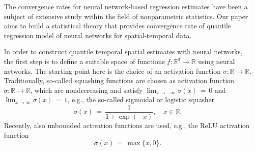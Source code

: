 \documentclass[twoside,11pt]{article}
\newcommand{\rev}[1]{{\color{revisionred}#1}}
\begin{document}
The convergence rates for neural network-based regression estimates have been a subject of extensive study within the field of nonparametric statistics. \rev{Our paper} aims to build a statistical theory that provides convergence rate of quantile
regression model of neural networks for spatial-temporal data. 

In order to construct quantile temporal spatial estimates with neural networks, the first step is to define a suitable space of functions \( f : \mathbb{R}^d \to \mathbb{R} \) using neural networks. The starting point here is the choice of an activation function \( \sigma : \mathbb{R} \to \mathbb{R} \). Traditionally, so-called squashing functions are chosen as activation function \( \sigma : \mathbb{R} \to \mathbb{R} \), which are nondecreasing and satisfy \( \lim_{x \to -\infty} \sigma(x) \,=\, 0 \) and \( \lim_{x \to \infty} \sigma(x) \,=\, 1 \), e.g., the so-called sigmoidal or logistic squasher
\begin{equation} \label{eq:sigmoid}
\sigma(x) \,=\, \frac{1}{1 + \exp(-x)}, \quad x \in \mathbb{R}.
\end{equation}
Recently, also unbounded activation functions are used, e.g., the ReLU activation function
\begin{equation} \label{eq:relu}
\sigma(x) \,=\, \max\{x, 0\}.
\end{equation}
\end{document}
